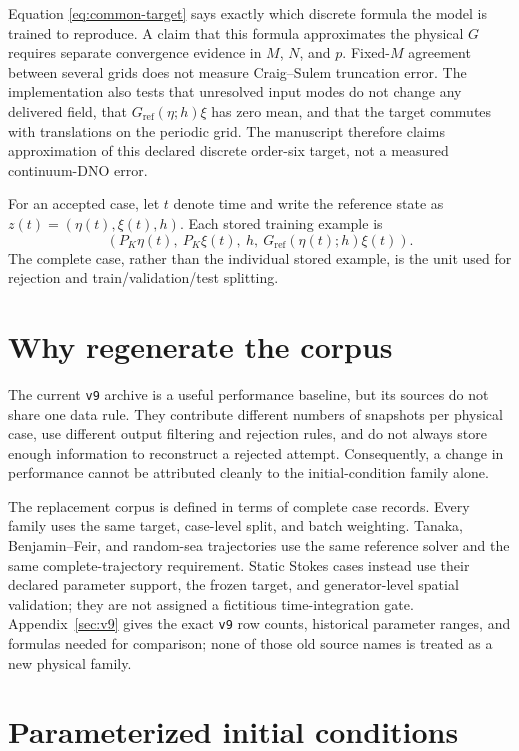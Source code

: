 \documentclass[11pt]{article}
\begin{document}
Equation \eqref{eq:common-target} says exactly which discrete formula the model is
trained to reproduce.  A claim that this formula approximates the physical $G$
requires separate convergence evidence in $M$, $N$, and $p$.  Fixed-$M$
agreement between several grids does not measure Craig--Sulem truncation
error.  The implementation also tests that unresolved input modes do not
change any delivered field, that $G_{\mathrm{ref}}(\eta;h)\xi$ has zero
mean, and that
the target commutes with translations on the periodic grid.  The manuscript
therefore claims approximation of this declared discrete order-six target,
not a measured continuum-DNO error.

For an accepted case, let $t$ denote time and write the reference state as
$z(t)=(\eta(t),\xi(t),h)$.  Each stored training
example is
\begin{equation}
  \left(
    P_K\eta(t),\ P_K\xi(t),\ h,\
    G_{\mathrm{ref}}(\eta(t);h)\xi(t)
  \right).
  \label{eq:stored-training-example}
\end{equation}
The complete case, rather than the individual stored example, is the unit
used for rejection and train/validation/test splitting.

\section{Why regenerate the corpus}

The current \texttt{v9} archive is a useful performance baseline, but its
sources do not share one data rule.  They contribute different numbers of
snapshots per physical case, use different output filtering and rejection
rules, and do not always store enough information to reconstruct a rejected
attempt.  Consequently, a change in performance cannot be attributed cleanly
to the initial-condition family alone.

The replacement corpus is defined in terms of complete case records.  Every
family uses the same target, case-level split, and batch weighting.  Tanaka,
Benjamin--Feir, and random-sea trajectories use the same reference solver and
the same complete-trajectory requirement.  Static Stokes cases instead use
their declared parameter support, the frozen target, and generator-level
spatial validation; they are not assigned a fictitious time-integration gate.
Appendix~\ref{sec:v9} gives the exact
\texttt{v9} row counts, historical parameter ranges, and formulas needed for
comparison; none of those old source names is treated as a new physical
family.
\section{Parameterized initial conditions}
\label{sec:families}
\end{document}
